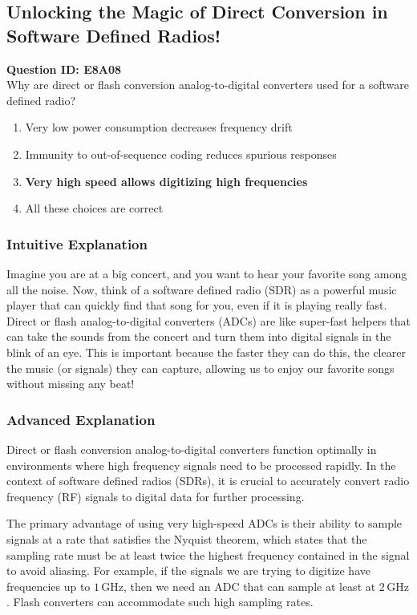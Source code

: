 \subsection{Unlocking the Magic of Direct Conversion in Software Defined Radios!}

\begin{tcolorbox}
\textbf{Question ID: E8A08} \\
Why are direct or flash conversion analog-to-digital converters used for a software defined radio? \\
\begin{enumerate}[label=\Alph*.]
    \item Very low power consumption decreases frequency drift
    \item Immunity to out-of-sequence coding reduces spurious responses
    \item \textbf{Very high speed allows digitizing high frequencies}
    \item All these choices are correct
\end{enumerate}
\end{tcolorbox}

\subsubsection{Intuitive Explanation}
Imagine you are at a big concert, and you want to hear your favorite song among all the noise. Now, think of a software defined radio (SDR) as a powerful music player that can quickly find that song for you, even if it is playing really fast. Direct or flash analog-to-digital converters (ADCs) are like super-fast helpers that can take the sounds from the concert and turn them into digital signals in the blink of an eye. This is important because the faster they can do this, the clearer the music (or signals) they can capture, allowing us to enjoy our favorite songs without missing any beat!

\subsubsection{Advanced Explanation}
Direct or flash conversion analog-to-digital converters function optimally in environments where high frequency signals need to be processed rapidly. In the context of software defined radios (SDRs), it is crucial to accurately convert radio frequency (RF) signals to digital data for further processing.

The primary advantage of using very high-speed ADCs is their ability to sample signals at a rate that satisfies the Nyquist theorem, which states that the sampling rate must be at least twice the highest frequency contained in the signal to avoid aliasing. For example, if the signals we are trying to digitize have frequencies up to \(1 \, \text{GHz}\), then we need an ADC that can sample at least at \(2 \, \text{GHz}\). Flash converters can accommodate such high sampling rates.


